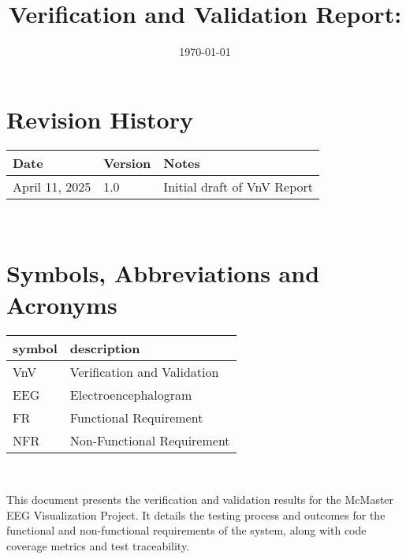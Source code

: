 \documentclass[12pt, titlepage]{article}
\begin{document}
\title{Verification and Validation Report: \progname} 
\author{\authname}
\date{\today}
	
\maketitle


\section{Revision History}

\begin{tabularx}{\textwidth}{p{3cm}p{2cm}X}
\toprule {\bf Date} & {\bf Version} & {\bf Notes}\\
\midrule
April 11, 2025 & 1.0 & Initial draft of VnV Report\\
\bottomrule
\end{tabularx}

~\newpage

\section{Symbols, Abbreviations and Acronyms}

\renewcommand{\arraystretch}{1.2}
\begin{tabular}{l l} 
  \toprule		
  \textbf{symbol} & \textbf{description}\\
  \midrule 
  VnV & Verification and Validation\\
  EEG & Electroencephalogram\\
  FR & Functional Requirement\\
  NFR & Non-Functional Requirement\\
  \bottomrule
\end{tabular}\\


\newpage

\tableofcontents

\listoftables %

\listoffigures %

\newpage


This document presents the verification and validation results for the McMaster EEG Visualization Project. It details the testing process and outcomes for the functional and non-functional requirements of the system, along with code coverage metrics and test traceability.
\end{document}

